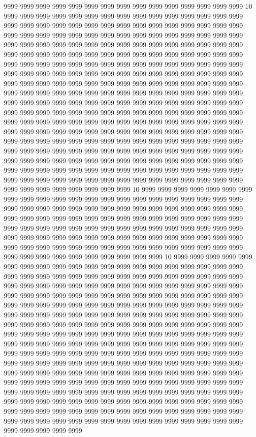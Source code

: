 9999 9999 9999 9999 9999 9999 9999 9999 9999 9999 9999 9999 9999 9999 9999 10 9999 9999 9999 9999 9999 9999 9999 9999 9999 9999 9999 9999 9999 9999 9999 9999 9999 9999 9999 9999 9999 9999 9999 9999 9999 9999 9999 9999 9999 9999 9999 9999 9999 9999 9999 9999 9999 9999 9999 9999 9999 9999 9999 9999 9999 9999 9999 9999 9999 9999 9999 9999 9999 9999 9999 9999 9999 9999 9999 9999 9999 9999 9999 9999 9999 9999 9999 9999 9999 9999 9999 9999 9999 9999 9999 9999 9999 9999 9999 9999 9999 9999 9999 9999 9999 9999 9999 9999 9999 9999 9999 9999 9999 9999 9999 9999 9999 9999 9999 9999 9999 9999 9999 9999 9999 9999 9999 9999 9999 9999 9999 9999 9999 9999 9999 9999 9999 9999 9999 9999 9999 9999 9999 9999 9999 9999 9999 9999 9999 9999 9999 9999 9999 9999 9999 9999 9999 9999 9999 9999 9999 9999 9999 9999 9999 9999 9999 9999 9999 9999 9999 9999 9999 9999 9999 9999 9999 9999 9999 9999 9999 9999 9999 9999 9999 9999 9999 9999 9999 9999 9999 9999 9999 9999 9999 9999 9999 9999 9999 9999 9999 9999 9999 9999 9999 9999 9999 9999 9999 9999 9999 9999 9999 9999 9999 9999 9999 9999 9999 9999 9999 9999 9999 9999 9999 9999 9999 9999 9999 9999 9999 9999 9999 9999 9999 9999 9999 9999 9999 9999 9999 9999 9999 9999 9999 9999 9999 9999 9999 9999 9999 9999 9999 9999 9999 9999 9999 9999 9999 9999 9999 9999 9999 9999 9999 9999 9999 9999 9999 9999 9999 9999 9999 9999 9999 9999 9999 9999 9999 9999 9999 9999 9999 9999 9999 9999 9999 9999 9999 9999 9999 9999 9999 9999 9999 9999 9999 9999 10 9999 9999 9999 9999 9999 9999 9999 9999 9999 9999 9999 9999 9999 9999 9999 9999 9999 9999 9999 9999 9999 9999 9999 9999 9999 9999 9999 9999 9999 9999 9999 9999 9999 9999 9999 9999 9999 9999 9999 9999 9999 9999 9999 9999 9999 9999 9999 9999 9999 9999 9999 9999 9999 9999 9999 9999 9999 9999 9999 9999 9999 9999 9999 9999 9999 9999 9999 9999 9999 9999 9999 9999 9999 9999 9999 9999 9999 9999 9999 9999 9999 9999 9999 9999 9999 9999 9999 9999 9999 9999 9999 9999 9999 9999 9999 9999 9999 9999 9999 9999 9999 9999 9999 9999 9999 9999 9999 10 9999 9999 9999 9999 9999 9999 9999 9999 9999 9999 9999 9999 9999 9999 9999 9999 9999 9999 9999 9999 9999 9999 9999 9999 9999 9999 9999 9999 9999 9999 9999 9999 9999 9999 9999 9999 9999 9999 9999 9999 9999 9999 9999 9999 9999 9999 9999 9999 9999 9999 9999 9999 9999 9999 9999 9999 9999 9999 9999 9999 9999 9999 9999 9999 9999 9999 9999 9999 9999 9999 9999 9999 9999 9999 9999 9999 9999 9999 9999 9999 9999 9999 9999 9999 9999 9999 9999 9999 9999 9999 9999 9999 9999 9999 9999 9999 9999 9999 9999 9999 9999 9999 9999 9999 9999 9999 9999 9999 9999 9999 9999 9999 9999 9999 9999 9999 9999 9999 9999 9999 9999 9999 9999 9999 9999 9999 9999 9999 9999 9999 9999 9999 9999 9999 9999 9999 9999 9999 9999 9999 9999 9999 9999 9999 9999 9999 9999 9999 9999 9999 9999 9999 9999 9999 9999 9999 9999 9999 9999 9999 9999 9999 9999 9999 9999 9999 9999 9999 9999 9999 9999 9999 9999 9999 9999 9999 9999 9999 9999 9999 9999 9999 9999 9999 9999 9999 9999 9999 9999 9999 9999 9999 9999 9999 9999 9999 9999 9999 9999 9999 9999 9999 9999 9999 9999 9999 9999 9999 9999 9999 9999 9999 9999 9999 9999 9999 9999 9999 9999 9999 9999 9999 9999 9999 9999 9999 9999 9999 9999 9999 9999 9999 9999 9999 9999 9999 9999 9999 9999 9999 9999 9999 9999 9999 9999 9999 9999 9999 9999 9999 9999 9999 9999 9999 9999 9999 9999 9999 9999 9999 9999 9999 9999 9999 9999 